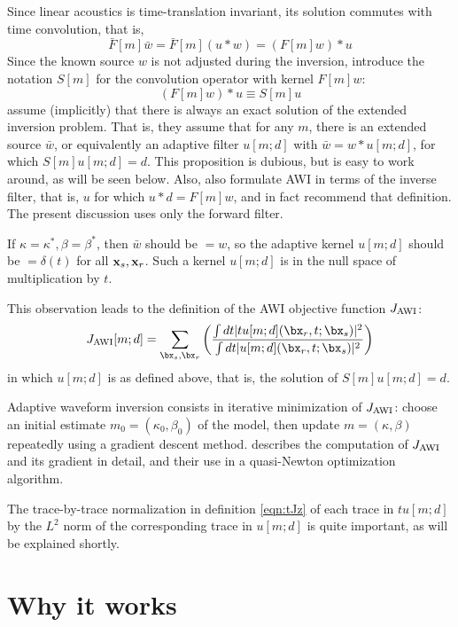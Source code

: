 Since linear acoustics is time-translation invariant, its solution commutes with time convolution, that is,
\[
 \bar{F}[m]\bar{w} = \bar{F}[m](u* w) = (F[m]w)*u
\]
Since the known source $w$ is not adjusted during the inversion, 
introduce the notation $S[m]$ for the convolution operator with kernel $F[m]w$:
\begin{equation}
  \label{eqn:sdef}
  (F[m]w)*u \equiv S[m]u
\end{equation}
\cite{Warner:16} assume (implicitly) that there is always an exact
solution of the extended inversion problem. That is, they assume that
for any $m$, there is an extended source $\bar{w}$, or equivalently an
adaptive filter $u[m;d]$ with $\bar{w}=w*u[m;d]$, for which
$S[m]u[m;d]= d$. This proposition is dubious, but is easy to work
around, as will be seen below. Also, \cite{Warner:16} also formulate
AWI in terms of the inverse filter, that is, $u$ for which
$u*d = F[m]w$, and in fact recommend that definition. The present
discussion uses only the forward filter.

If $\kappa = \kappa^*, \beta = \beta^*$, then $\bar{w}$ should be $= w$,
so the adaptive kernel $u[m;d]$ should be $=\delta(t)$ for all
${\bf x}_s,{\bf x}_r$. Such a kernel $u[m;d]$ is in the null space of
multiplication by $t$.

This observation leads to the definition of the AWI objective function $J_{\rm AWI}$:
\begin{equation}
  \label{eqn:tJz}
  J_{\rm AWI}[m;d] = \sum_{\bx_s,\bx_r} \left(\frac{\int dt |tu[m;d](\bx_r,t;\bx_s)|^2}{\int dt |u[m;d](\bx_r,t;\bx_s)|^2}\right)
\end{equation}
in which $u[m;d]$ is as defined above, that is, the solution of $S[m]u[m;d]
= d$.

Adaptive waveform inversion consists in iterative minimization of
$J_{\rm AWI}$: choose an initial estimate $m_0=(\kappa_0,\beta_0)$ of the
model, then update $m=(\kappa,\beta)$ repeatedly using a gradient
descent method. \cite{Warner:16} describes the computation of $J_{\rm AWI}$
and its gradient in detail, and their use in a quasi-Newton
optimization algorithm.

The trace-by-trace normalization in definition \ref{eqn:tJz} of each
trace in $tu[m;d]$ by the
$L^2$ norm of the corresponding trace in $u[m;d]$ is quite important, as will be explained shortly.

\section{Why it works}

